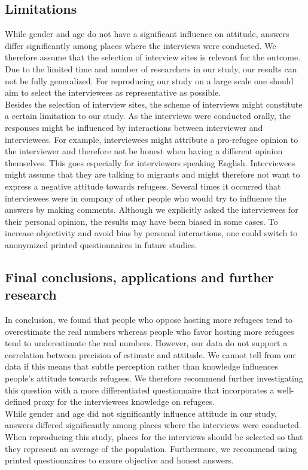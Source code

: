 \documentclass{article}
\begin{document}
\subsection{Limitations}
While gender and age do not have a significant influence on attitude, answers differ significantly among places where the interviews were conducted. We therefore assume that the selection of interview sites is relevant for the outcome. Due to the limited time and number of researchers in our study, our results can not be fully generalized. For reproducing our study on a large scale one should aim to select the interviewees as representative as possible.\\
Besides the selection of interview sites, the scheme of interviews might constitute a certain limitation to our study. As the interviews were conducted orally, the responses might be influenced by interactions between interviewer and interviewees. For example, interviewees might attribute a pro-refugee opinion to the interviewer and therefore not be honest when having a different opinion themselves. This goes especially for interviewers speaking English. Interviewees might assume that they are talking to migrants and might therefore not want to express a negative attitude towards refugees. Several times it occurred that interviewees were in company of other people who would try to influence the answers by making comments. Although we explicitly asked the interviewees for their personal opinion, the results may have been biased in some cases. To increase objectivity and avoid bias by personal interactions, one could switch to anonymized printed questionnaires in future studies.\\

\subsection{Final conclusions, applications and further research}

In conclusion, we found that people who oppose hosting more refugees tend to overestimate the real numbers whereas people who favor hosting more refugees tend to underestimate the real numbers. However, our data do not support a correlation between precision of estimate and attitude. We cannot tell from our data if this means that subtle perception rather than knowledge influences people's attitude towards refugees. We therefore recommend further investigating this question with a more differentiated questionnaire that incorporates a well-defined proxy for the interviewees knowledge on refugees.\\
While gender and age did not significantly influence attitude in our study, answers differed significantly among places where the interviews were conducted. When reproducing this study, places for the interviews should be selected so that they represent an average of the population. Furthermore, we recommend using printed questionnaires to ensure objective and honest answers.
\end{document}
